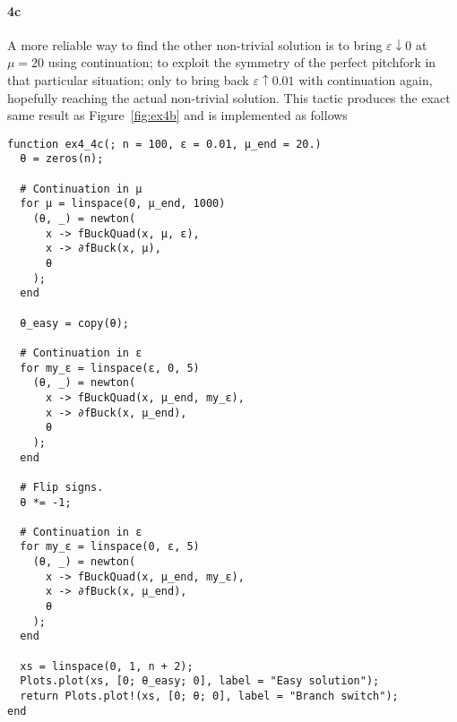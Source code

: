 \documentclass[a4paper]{article}
\begin{document}
  \newpage
  \paragraph{4c} A more reliable way to find the other non-trivial solution is to bring $\varepsilon \downarrow 0$ at $\mu = 20$ using continuation; to exploit the symmetry of the perfect pitchfork in that particular situation; only to bring back $\varepsilon \uparrow 0.01$ with continuation again, hopefully reaching the actual non-trivial solution. This tactic produces the exact same result as Figure~\ref{fig:ex4b} and is implemented as follows
\begin{verbatim}
function ex4_4c(; n = 100, ɛ = 0.01, μ_end = 20.)
  θ = zeros(n);

  # Continuation in μ
  for μ = linspace(0, μ_end, 1000)
    (θ, _) = newton(
      x -> fBuckQuad(x, μ, ɛ),
      x -> ∂fBuck(x, μ),
      θ
    );
  end

  θ_easy = copy(θ);

  # Continuation in ɛ
  for my_ɛ = linspace(ɛ, 0, 5)
    (θ, _) = newton(
      x -> fBuckQuad(x, μ_end, my_ɛ),
      x -> ∂fBuck(x, μ_end),
      θ
    );
  end

  # Flip signs.
  θ *= -1;

  # Continuation in ɛ
  for my_ɛ = linspace(0, ɛ, 5)
    (θ, _) = newton(
      x -> fBuckQuad(x, μ_end, my_ɛ),
      x -> ∂fBuck(x, μ_end),
      θ
    );
  end

  xs = linspace(0, 1, n + 2);
  Plots.plot(xs, [0; θ_easy; 0], label = "Easy solution");
  return Plots.plot!(xs, [0; θ; 0], label = "Branch switch");
end
\end{verbatim}

  \newpage
\end{document}
